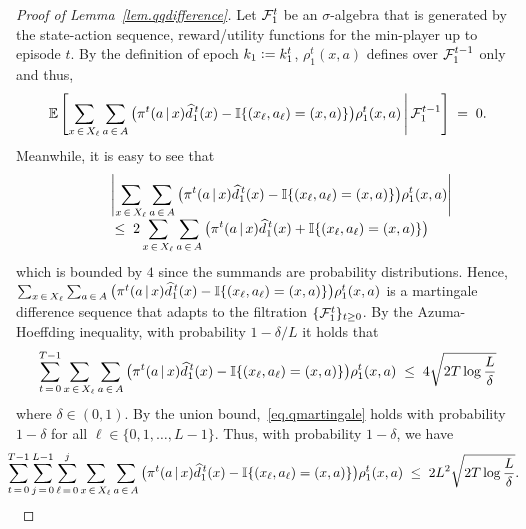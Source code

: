 \documentclass[12pt, final]{l4dc2023}
\begin{document}
\begin{proof}[Proof of Lemma~\ref{lem.qqdifference}]
	Let ${\mathcal{F}}_1^{t}$ be an $\sigma$-algebra that is generated by the state-action sequence, reward/utility functions for the min-player up to episode $t$. By the definition of epoch $k_1\mathrel{\mathop:}= k_1^t$, $\rho_1^t(x,a)$ defines over ${\mathcal{F}}_{1}^{t-1}$ only and thus,
	\[
	\mathbb{E} \left[  	
		\sum_{x\,\in\,X_\ell}\sum_{a\,\in\,A}  \big(\pi^t(a\,\vert\,x) \widehat d_1^{\,t}(x) - \mathbb{I}{\{{(x_\ell,a_\ell)=(x,a)}\}} \big)\rho_1^t(x,a) \,\Bigg\vert\, {\mathcal{F}}_{1}^{t-1}
	\right]
	\;=\; 0.
	\]
	Meanwhile, 
	it is easy to see that 
	\[
	\begin{array}{rcl}
	&& \displaystyle \left|  	
		\sum_{x\,\in\,X_\ell}\sum_{a\,\in\,A}  \big(\pi^t(a\,\vert\,x) \widehat d_1^{\,t}(x) - \mathbb{I}{\{{(x_\ell,a_\ell)=(x,a)}\}} \big)\rho_1^t(x,a) 
	\right|
	\\[0.2cm]
	&&\displaystyle
	\;\leq\;
	2	\sum_{x\,\in\,X_\ell}\sum_{a\,\in\,A}  \big(\pi^t(a\,\vert\,x) \widehat d_1^{\,t}(x) + \mathbb{I}{\{{(x_\ell,a_\ell)=(x,a)}\}} \big)
	\end{array}
	\]
	which is bounded by $4$ since the summands are probability distributions. Hence, \\$\sum_{x\,\in\,X_\ell}\sum_{a\,\in\,A}  \big(\pi^t(a\,\vert\,x) \widehat d_1^{\,t} (x) - \mathbb{I}{\{{(x_\ell,a_\ell)=(x,a)}\}} \big)\rho_1^t(x,a)$ is a martingale difference sequence that adapts to the filtration $\{{\mathcal{F}}_{1}^{t}\}_{t\geq0}$. By the Azuma-Hoeffding inequality, with probability $1-\delta/L$ it holds that
	\begin{equation}\label{eq.qmartingale}
	\sum_{t\,=\,0}^{T-1}\sum_{x\,\in\,X_\ell}\sum_{a\,\in\,A}  \big(\pi^t(a\,\vert\,x) \widehat d_1^{\,t}(x) - \mathbb{I}{\{{(x_\ell,a_\ell)=(x,a)}\}} \big)\rho_1^t(x,a) 
	\;\leq\;
	4 \sqrt{2T \log \frac{L}{\delta}}
	\end{equation}
	where $\delta\in (0,1)$. By the union bound,~\eqref{eq.qmartingale} holds with probability $1-\delta$ for all $\ell\in\{ 0,1,\ldots,L-1 \}$. Thus, with probability $1-\delta$, we have
	\begin{equation}\label{eq.qmartingale_TL}
	\!\!\!\! 
	\sum_{t\,=\,0}^{T-1} \sum_{j\,=\,0}^{L-1} \sum_{\ell\,=\,0}^{j}\sum_{x\,\in\,X_\ell}\sum_{a\,\in\,A}  \big(\pi^t(a\,\vert\,x) \widehat d_1^{\,t}(x) - \mathbb{I}{\{{(x_\ell,a_\ell)=(x,a)}\}} \big)\rho_1^t(x,a) 
	\;\leq\;
	2L^2 \sqrt{2T \log \frac{L}{\delta}}.
	\end{equation}
	

\end{proof}
\end{document}
